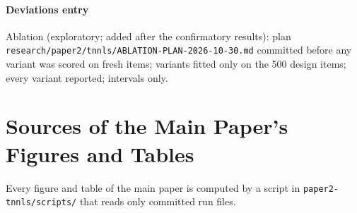 \documentclass[journal,onecolumn]{IEEEtran}
\theoremstyle{plain}
\begin{document}
\paragraph*{Deviations entry}
Ablation (exploratory; added after the confirmatory results): plan
\nolinkurl{research/paper2/tnnls/ABLATION-PLAN-2026-10-30.md} committed before any variant was scored on fresh items; variants fitted only
on the 500 design items; every variant reported; intervals only.

\section{Sources of the Main Paper's Figures and Tables}\label{sup:sources}
Every figure and table of the main paper is computed by a script in \nolinkurl{paper2-tnnls/scripts/} that reads only committed run files.
\end{document}
